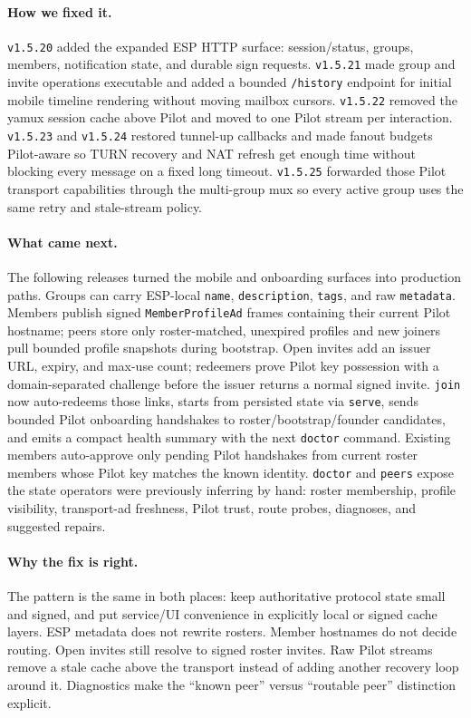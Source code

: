 \documentclass[11pt,a4paper]{article}
\begin{document}
\paragraph{How we fixed it.} \texttt{v1.5.20} added the expanded ESP
HTTP surface: session/status, groups, members, notification state, and
durable sign requests. \texttt{v1.5.21} made group and invite
operations executable and added a bounded \texttt{/history} endpoint
for initial mobile timeline rendering without moving mailbox cursors.
\texttt{v1.5.22} removed the yamux session cache above Pilot and moved
to one Pilot stream per interaction. \texttt{v1.5.23} and
\texttt{v1.5.24} restored tunnel-up callbacks and made fanout budgets
Pilot-aware so TURN recovery and NAT refresh get enough time without
blocking every message on a fixed long timeout. \texttt{v1.5.25}
forwarded those Pilot transport capabilities through the multi-group
mux so every active group uses the same retry and stale-stream policy.

\paragraph{What came next.} The following releases turned the mobile
and onboarding surfaces into production paths. Groups can carry
ESP-local \texttt{name}, \texttt{description}, \texttt{tags}, and raw
\texttt{metadata}. Members publish signed \texttt{MemberProfileAd}
frames containing their current Pilot hostname; peers store only
roster-matched, unexpired profiles and new joiners pull bounded
profile snapshots during bootstrap. Open invites add an issuer URL,
expiry, and max-use count; redeemers prove Pilot key possession with a
domain-separated challenge before the issuer returns a normal signed
invite. \texttt{join} now auto-redeems those links, starts from
persisted state via \texttt{serve}, sends bounded Pilot onboarding
handshakes to roster/bootstrap/founder candidates, and emits a compact
health summary with the next \texttt{doctor} command. Existing members
auto-approve only pending Pilot handshakes from current roster members
whose Pilot key matches the known identity. \texttt{doctor} and
\texttt{peers} expose the state operators were previously inferring by
hand: roster membership, profile visibility, transport-ad freshness,
Pilot trust, route probes, diagnoses, and suggested repairs.

\paragraph{Why the fix is right.} The pattern is the same in both
places: keep authoritative protocol state small and signed, and put
service/UI convenience in explicitly local or signed cache layers. ESP
metadata does not rewrite rosters. Member hostnames do not decide
routing. Open invites still resolve to signed roster invites. Raw
Pilot streams remove a stale cache above the transport instead of
adding another recovery loop around it. Diagnostics make the
``known peer'' versus ``routable peer'' distinction explicit.
\end{document}
